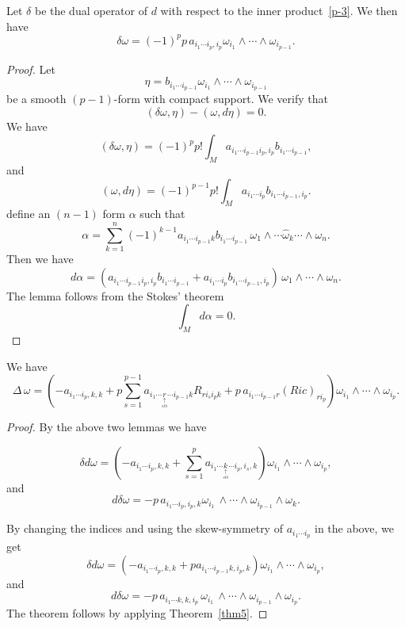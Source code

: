 \begin{lemma} Let $\delta$ be the dual operator of $d$ with respect to the inner product~\eqref{p-3}.  We then have
\[
\delta\omega=(-1)^pp\,a_{i_1\cdots i_p,i_p}\omega_{i_1}\wedge\cdots \wedge\omega_{i_{p-1}}.
\]
\end{lemma}

\begin{proof}  Let 
\[
\eta=b_{i_1\cdots i_{p-1}}\omega_{i_1}\wedge\cdots\wedge\omega_{i_{p-1}}
\]
be a smooth $(p-1)$-form with compact support.  We verify that 
\[
(\delta\omega,\eta)-(\omega,d\eta)=0.
\]
We have
\[
(\delta\omega,\eta)=(-1)^{p}p!\int_M a_{i_1\cdots i_{p-1}i_p,i_p}b_{i_1\cdots i_{p-1}},
\]
and
\[
(\omega,d\eta)=(-1)^{p-1}p!\int_M a_{i_1\cdots i_p}b_{i_1\cdots i_{p-1},i_p}.
\]
define an $(n-1)$ form $\alpha$ such that
\[
\alpha=\sum_{k=1}^n (-1)^{k-1}a_{i_1\cdots i_{p-1} k}b_{i_1\cdots i_{p-1}}\,\omega_1\wedge\cdots\hat{\omega}_k\cdots\wedge\omega_n.
\]
Then we have
\[
d\alpha=(a_{i_1\cdots i_{p-1}i_p,i_p}b_{i_1\cdots i_{p-1}} +a_{i_1\cdots i_p}b_{i_1\cdots i_{p-1},i_p})\,\omega_1\wedge\cdots\wedge\omega_n.
\]
The lemma follows from the Stokes' theorem
\[
\int_M d\alpha=0.
\]

\end{proof}








\begin{theorem}\label{thm6}
 We have
\[
\Delta\,\omega=\left(-a_{i_1\cdots i_p,k,k}+p\sum_{s=1}^{p-1}a_{i_1\cdots \underset{\underset{sth}{\uparrow}}r\cdots i_{p-1} k}R_{ri_si_pk}+p \, a_{i_1\cdots i_{p-1} r}(Ric)_{r i_p}\right)\omega_{i_1}\wedge\cdots\wedge\omega_{i_p}.
\]
\end{theorem}

\begin{proof} By the above two lemmas we have


\[
\delta d\omega=\left(-a_{i_1\cdots i_p,k,k}+\sum_{s=1}^p a_{i_1\cdots \underset{\underset{sth}{\uparrow}}k\cdots i_p, i_s,k}\right)
\omega_{i_1}\wedge\cdots\wedge\omega_{i_p},
\]
and
\[
d\delta\omega=-p\, a_{i_1\cdots i_p,i_p,k}\omega_{i_1}\,\wedge\cdots\wedge\omega_{i_{p-1}}\wedge\omega_k.
\]

By changing the indices and using the skew-symmetry of $a_{i_1\cdots i_p}$ in the above, we get
\[
\delta d\omega=\left(-a_{i_1\cdots i_p,k,k}+p a_{i_1\cdots i_{p-1}k, i_p,k}\right)
\omega_{i_1}\wedge\cdots\wedge\omega_{i_p},
\]
and
\[
d\delta\omega=-p\, a_{i_1\cdots k,k,i_p}\,\omega_{i_1}\,\wedge\cdots\wedge\omega_{i_{p-1}}\wedge\omega_{i_p}.
\]
The theorem follows by applying Theorem~\ref{thm5}.

\end{proof}

